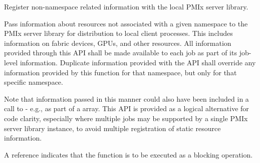 Register non-namespace related information with the local \ac{PMIx} server library.

\format


\begin{arglist}
\end{arglist}

\descr

Pass information about resources not associated with a given namespace to the \ac{PMIx} server library for distribution to local client processes. This includes information on fabric devices, \acp{GPU}, and other resources. All information provided through this \ac{API} shall be made available to each job as part of its job-level information. Duplicate information provided with the  \ac{API} shall override any information provided by this function for that namespace, but only for that specific namespace.

\returnsimple

\advicermstart
Note that information passed in this manner could also have been included in a call to  - e.g., as part of a  array. This \ac{API} is provided as a logical alternative for code clarity, especially where multiple jobs may be supported by a single \ac{PMIx} server library instance, to avoid multiple registration of static resource information.

A   reference indicates that the function is to be executed as a blocking operation.
\advicermend


\subsection{}

